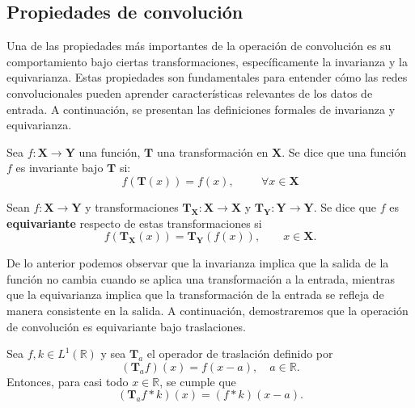 \subsection{Propiedades de convolución}
Una de las propiedades más importantes de la operación de convolución es su comportamiento bajo ciertas transformaciones, específicamente la invarianza y la equivarianza. Estas propiedades son fundamentales para entender cómo las redes convolucionales pueden aprender características relevantes de los datos de entrada.
A continuación, se presentan las definiciones formales de invarianza y equivarianza.

\begin{definition}[Invarianza]
\label{def:invarianza}
    Sea $f: \mathbf{X} \longrightarrow \mathbf{Y}$ una función, $\mathbf{T}$ una transformación en $\mathbf{X}$. Se dice que una función $f$ es invariante bajo $\mathbf{T}$ si:
    \[
        f\left(\mathbf{T}(x)\right) = f(x) , \hspace{1cm} \forall x \in \mathbf{X}
    \]
\end{definition}

\begin{definition}[Equivarianza]
\label{def:equivarianza}
Sean $f:\mathbf X\to\mathbf Y$ y transformaciones $\mathbf T_{\mathbf X}:\mathbf X\to\mathbf X$ y $\mathbf T_{\mathbf Y}:\mathbf Y\to\mathbf Y$. Se dice que $f$ es \textbf{equivariante} respecto de estas transformaciones si
\[
f(\mathbf T_{\mathbf X}(x))=\mathbf T_{\mathbf Y}(f(x)),\qquad x\in\mathbf X.
\]
\end{definition}
De lo anterior podemos observar que la invarianza implica que la salida de la función no cambia cuando se aplica una transformación a la entrada, mientras que la equivarianza implica que la transformación de la entrada se refleja de manera consistente en la salida.
A continuación, demostraremos que la operación de convolución es equivariante bajo traslaciones.

\begin{teorema}
\label{teo:convolucion-traslaciones}

    Sea $f, k \in L^1(\mathbb{R})$ y sea $\mathbf{T}_a$ el operador de traslación definido por
    \[
        (\mathbf{T}_a f)(x) = f(x - a), \quad a \in \mathbb{R}.
    \]
    Entonces, para casi todo $x \in \mathbb{R}$, se cumple que
    \[
        (\mathbf{T}_a f \ast k)(x) = (f \ast k)(x - a).
    \]
\end{teorema}

